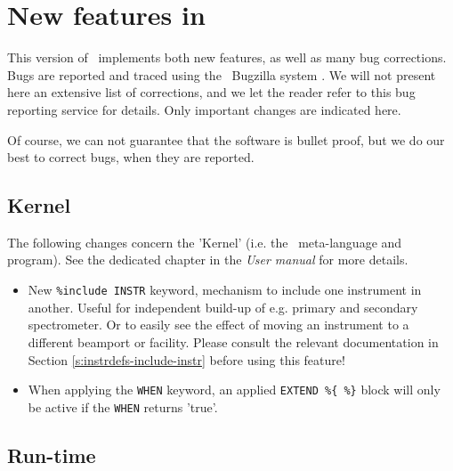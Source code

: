 
\chapter{New features in \MCS\ \version\ }
\label{c:changes}

This version of \MCS\ implements both new features, as well as many bug corrections. Bugs are reported and traced using the \MCS\ Bugzilla system \cite{mczilla_webpage}. We will not present here an extensive list of corrections, and we let the reader refer to this bug reporting service for details. Only important changes are indicated here.

Of course, we can not guarantee that the software is bullet proof, but we do our best to correct bugs, when they are reported.


\section{Kernel}
\label{s:new-features:kernel}

The following changes concern the 'Kernel' (i.e. the \MCS\ meta-language and program). See the dedicated chapter in the {\it User manual} for more details.

\begin{itemize}
\item New \verb+%include INSTR+ keyword, mechanism to include one instrument in another. Useful for independent
     build-up of e.g. primary and secondary spectrometer. Or to easily see the effect of moving an instrument
     to a different beamport or facility. Please consult the relevant
     documentation in Section \ref{s:instrdefs-include-instr} 
     before using this feature!
\item When applying the \verb+WHEN+ keyword, an applied \verb+EXTEND %{ %}+ block will only be active if the \verb+WHEN+
     returns 'true'.
\end{itemize}

\section{Run-time}
\label{s:new-features:run-time}

